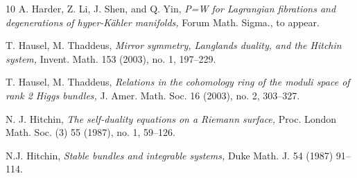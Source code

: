\documentclass[11pt]{amsart}
\theoremstyle{plain}
\theoremstyle{definition}
\theoremstyle{remark}
\begin{document}
\begin{thebibliography}{10}
 A. Harder, Z. Li, J. Shen, and Q. Yin, {\em P=W for Lagrangian fibrations and degenerations of hyper-K\"ahler manifolds,} Forum Math. Sigma., to appear.




 T. Hausel, M. Thaddeus, {\em Mirror symmetry, Langlands duality, and the Hitchin
system,} Invent. Math. 153 (2003), no. 1, 197--229. 


 T. Hausel, M. Thaddeus, {\em Relations in the cohomology ring of the moduli space of rank 2 Higgs bundles,} J. Amer. Math. Soc. 16 (2003), no. 2, 303--327.





 N. J. Hitchin, {\em The self-duality equations on a Riemann surface,} Proc. London Math. Soc. (3) 55 (1987), no. 1, 59--126.

 N.J. Hitchin, {\em Stable bundles and integrable systems,} Duke Math. J. 54 (1987) 91--114.







\end{thebibliography}
\end{document}
